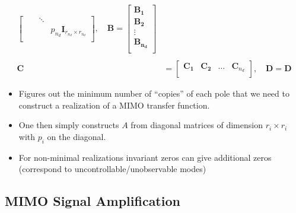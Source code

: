 \begin{enumerate}
\begin{align*}
\begin{bmatrix}
                                                               &                                & \ddots &                                            \\
                                                               &                                &        & p_{n_d} \mathbf{I}_{r_{n_d}\times r_{n_d}} \\
                            \end{bmatrix},\quad
              \mathbf{B}  =\begin{bmatrix}
                               \mathbf{B_1}     \\
                               \mathbf{B_2}     \\
                               \vdots           \\
                               \mathbf{B_{n_d}} \\
                           \end{bmatrix}                                                                                \\                                                                             \\
              \mathbf{C} & =\begin{bmatrix}
                                \mathbf{C_1} & \mathbf{C_2} & \dots & \mathbf{C}_{n_d} \\
                            \end{bmatrix}, \quad
              \mathbf{D}  = \mathbf{D}
          \end{align*}
\end{enumerate}


\begin{itemize}
    \item Figures out the minimum number of ``copies'' of each pole that we need to construct a realization of a MIMO transfer function.
    \item One then simply constructs $A$ from diagonal matrices of dimension $r_i\times r_i$ with $p_i$ on the diagonal.
    \item For non-minimal realizations invariant zeros can give additional zeros (correspond to uncontrollable/unobservable modes)
\end{itemize}

\subsection{MIMO Signal Amplification}

